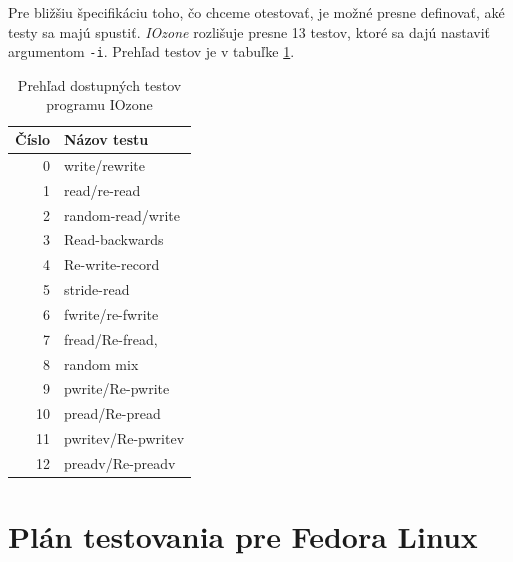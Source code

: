 Pre bližšiu špecifikáciu toho, čo chceme otestovať, je možné presne definovať,
aké testy sa majú spustiť. \emph{IOzone} rozlišuje presne 13 testov, ktoré sa
dajú nastaviť argumentom \texttt{-i}. Prehľad testov je v tabuľke
\ref{tab:iozone-tests}.

\begin{table}[H]
\begin{center}
\begin{tabular}{|r|l|}
    \hline
    \textbf{Číslo} & \textbf{Názov testu} \\
    \hline
    0 & write/rewrite \\
    1 & read/re-read \\
    2 & random-read/write \\
    3 & Read-backwards \\
    4 & Re-write-record \\
    5 & stride-read \\
    6 & fwrite/re-fwrite \\
    7 & fread/Re-fread, \\
    8 & random mix \\
    9 & pwrite/Re-pwrite \\
    10 & pread/Re-pread \\
    11 & pwritev/Re-pwritev \\
    12 & preadv/Re-preadv \\
    \hline
\end{tabular}
\caption{Prehľad dostupných testov programu IOzone}
\label{tab:iozone-tests}
\end{center}
\end{table}

%
%

\chapter{Plán testovania pre Fedora Linux}



